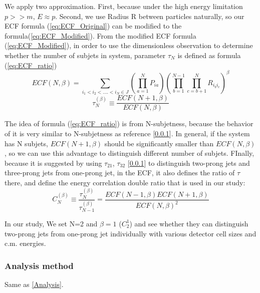 We apply two approximation. First, because under the high energy limitation $p>>m$, $E\approx p$. Second, we use Radius R between particles naturally, so our ECF formula (\ref{eq:ECF_Original}) can be modified to the formula(\ref{eq:ECF_Modified}). From the modified ECF formula (\ref{eq:ECF_Modified}), in order to use the dimensionless observation to determine whether the number of subjets in system, parameter $\tau_{N}$ is defined as formula (\ref{eq:ECF_ratio})\\ 
\begin{equation} \label{eq:ECF_Modified}
ECF(N,\beta)=\sum_{i_{1}<i_{2}<....<i_{N}\in J} (\prod_{a=1}^{N}P_{ia})(\prod_{b=1}^{N-1}\prod_{c=b+1}^{N} R_{i_{b}i_{c}})^{\beta}
\end{equation}
\begin{equation} \label{eq:ECF_ratio}
\tau_{N}^{(\beta)}\equiv\frac{ECF(N+1,\beta)}{ECF(N,\beta)}
\end{equation}

The idea of formula (\ref{eq:ECF_ratio}) is from N-subjetness, because the behavior of it is very similar to N-subjetness as reference [\ref{}]. In general, if the system has N subjets, $ECF(N+1,\beta)$ should be significantly smaller than $ECF(N,\beta)$, so we can use this advantage to distinguish different number of subjets. FInally, because it is suggested by using $\tau_{21}$, $\tau_{32}$ [\ref{}] to distinguish two-prong jets and three-prong jets from one-prong jet, in the ECF, it also defines the ratio of $\tau$ there, and define the energy correlation double ratio that is used in our study:\\
\begin{equation}
C_{N}^{(\beta)}\equiv\frac{\tau_{N}^{(\beta)}}{\tau_{N-1}^{(\beta)}}=\frac{ECF(N-1,\beta)ECF(N+1,\beta)}{ECF(N,\beta)^2}
\end{equation}

In our study, We set N=2 and $\beta=1$ ($C_{2}^{1}$) and see whether they can distinguish two-prong jets from one-prong jet individually with various detector cell sizes and c.m. energies.\\
\subsubsection{Analysis method}
Same as \ref{Analysis}.
